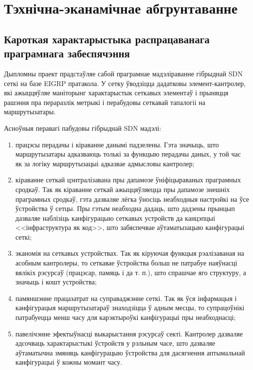 \section{Тэхнічна-эканамічнае абгрунтаванне}

\subsection{Кароткая характарыстыка распрацаванага праграмнага забеспячэння}

Дыпломны праект прадстаўляе сабой праграмнае мадэліраванне гібрыднай SDN сеткі на базе EIGRP пратакола. У сетку ўводзіцца дадатковы элемент-кантролер, які ажыццяўляе маніторынг характарыстык сеткавых
элементаў і прыняцця рашэння пра пераразлік метрыкі і перабудовы сеткавай тапалогіі на маршрутызатары.

Асноўныя перавагі пабудовы гібрыднай SDN мадэлі:
\begin{enumerate}
    \item працэсы перадачы і кіраванне данымі падзелены. Гэта значыць, што маршрутызатары
        адказваюць толькі за функцыю перадачы даных, у той час як за логіку маршрутызацыі
        адказвае адмысловы кантролер;
    \item кіраванне сеткай цэнтралізавана пры дапамозе ўніфіцыраваных праграмных сродкаў.
        Так як кіраванне сеткай ажыццяўляецца пры дапамозе знешніх праграмных сродкаў, гэта
        дазваляе лёгка ўносіць неабходныя настройкі на ўсе ўстройства ў сетцы.
        Пры гэтым неабходна дадаць, што дадзены прынцып дазваляе наблізіць канфігурацыю
        сеткавых устройств да канцэпцыі <<інфраструктура як код>>, што забяспечвае
        аўтаматызацыю канфігурацыі сеткі;
    \item эканомія на сеткавых устройствах. Так як кіруючая функцыя рэалізаваная на асобным
        кантролеры, то сеткавае ўстройства больш не патрабуе наяўнасці вялікіх рэсурсаў
        (працэсар, памяць і да т. п.), што спрашчае яго структуру, а значыць і кошт устройства;
    \item памяншэнне працазатрат на суправаджэнне сеткі. Так як ўся інфармацыя і канфігурацыя
        маршрутызатараў знаходзіцца ў адным месцы, то супрацоўнікі патрабуецца менш часу для
        карэктыроўкі канфігурацыі пры неабходнасці;
    \item павелічэнне эфектыўнасці выкарыстання рэсурсаў секті. Кантролер дазваляе адсочваць
        характарыстыкі ўстройств у рэльным часе, што дазваляе аўтаматычна змяняць канфігурацыю
        ўстройства для дасягнення аптымальнай канфігурацыі ў кожны момант часу.
\end{enumerate}

